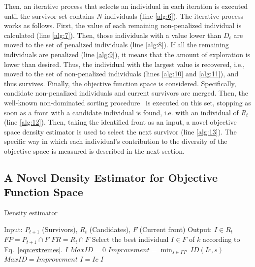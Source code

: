 Then, an iterative process that selects an individual in each iteration is executed until the survivor
set contains $N$ individuals (line \ref{alg:6}).
%
The iterative process works as follows.
%
First, the \DCS{} value of each remaining non-penalized individual is calculated (line \ref{alg:7}).
%
Then, those individuals with a \DCS{} value lower than $D_t$ are moved to the set of penalized individuals (line \ref{alg:8}).
%
If all the remaining individuals are penalized (line \ref{alg:9}), it means that the amount of exploration is lower than desired.
%
Thus, the individual with the largest \DCS{} value is recovered, i.e., moved to the set of non-penalized individuals (lines \ref{alg:10} and \ref{alg:11}), and thus survives.
%
Finally, the objective function space is considered.
%
Specifically, candidate non-penalized individuals and current survivors are merged.
%
Then, the well-known non-dominated sorting procedure~\cite{Joel:NSGAII} is executed on this set, stopping as soon as a front with 
a candidate individual is found, i.e. with an individual of $R_t$ (line \ref{alg:12}).
%
Then, taking the identified front as an input, a novel objective space density estimator is used to select
the next survivor (line \ref{alg:13}).
%
The specific way in which each individual's contribution to the diversity of the objective space is measured is described in the next section.
%

\subsection{A Novel Density Estimator for Objective Function Space}
\label{subsection:density}

\begin{algorithm}[t]
	\caption{Density estimator} 
\begin{small}
\begin{algorithmic}[1]
\STATE Input: $P_{t+1}$ (Survivors), $R_t$ (Candidates), $F$ (Current front)
    	\STATE Output: $I \in R_t$ 
	\STATE $FP = P_{t+1} \cap F$ \label{alg:FP}
	\STATE $FR = R_{t} \cap F$ \label{alg:FR}
        \label{alg:density_for}
	      \STATE Select the best individual $I \in F$ of $k$ according to Eq.~\ref{eqn:extremes}.\label{alg:density_1}
	  	 \RETURN $I$ \label{alg:density_2}
	  	\ENDIF
	\ENDFOR\label{alg:density_endfor}
	\STATE $MaxID = 0$ \label{alg:density_for2}
	\STATE $Improvement = \displaystyle{\min_{s \in FP}\ ID(Ic, s)}$ 
	 \label{alg:density_if2}
	   \STATE $MaxID = Improvement$
	   \STATE $I = Ic$ 
	\ENDIF \label{alg:density_endif2}
	\ENDFOR	\label{alg:density_endfor2}
    	\RETURN $I$ \label{alg:density_4}
	\end{algorithmic}
\end{small}
\label{alg:Density_Estimator}
\end{algorithm}

